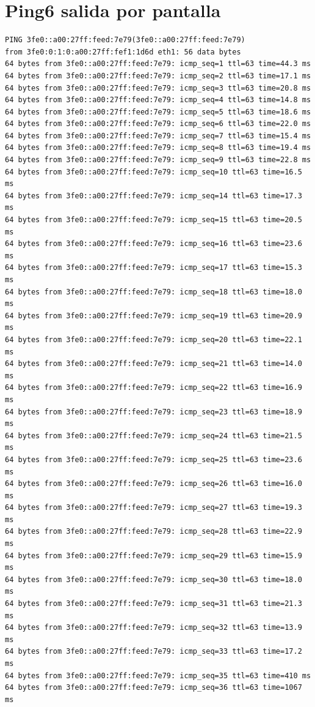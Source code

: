 \documentclass{article}
\begin{document}
\section{Ping6 salida por pantalla}
\begin{Verbatim}
PING 3fe0::a00:27ff:feed:7e79(3fe0::a00:27ff:feed:7e79)
from 3fe0:0:1:0:a00:27ff:fef1:1d6d eth1: 56 data bytes
64 bytes from 3fe0::a00:27ff:feed:7e79: icmp_seq=1 ttl=63 time=44.3 ms
64 bytes from 3fe0::a00:27ff:feed:7e79: icmp_seq=2 ttl=63 time=17.1 ms
64 bytes from 3fe0::a00:27ff:feed:7e79: icmp_seq=3 ttl=63 time=20.8 ms
64 bytes from 3fe0::a00:27ff:feed:7e79: icmp_seq=4 ttl=63 time=14.8 ms
64 bytes from 3fe0::a00:27ff:feed:7e79: icmp_seq=5 ttl=63 time=18.6 ms
64 bytes from 3fe0::a00:27ff:feed:7e79: icmp_seq=6 ttl=63 time=22.0 ms
64 bytes from 3fe0::a00:27ff:feed:7e79: icmp_seq=7 ttl=63 time=15.4 ms
64 bytes from 3fe0::a00:27ff:feed:7e79: icmp_seq=8 ttl=63 time=19.4 ms
64 bytes from 3fe0::a00:27ff:feed:7e79: icmp_seq=9 ttl=63 time=22.8 ms
64 bytes from 3fe0::a00:27ff:feed:7e79: icmp_seq=10 ttl=63 time=16.5 ms
64 bytes from 3fe0::a00:27ff:feed:7e79: icmp_seq=14 ttl=63 time=17.3 ms
64 bytes from 3fe0::a00:27ff:feed:7e79: icmp_seq=15 ttl=63 time=20.5 ms
64 bytes from 3fe0::a00:27ff:feed:7e79: icmp_seq=16 ttl=63 time=23.6 ms
64 bytes from 3fe0::a00:27ff:feed:7e79: icmp_seq=17 ttl=63 time=15.3 ms
64 bytes from 3fe0::a00:27ff:feed:7e79: icmp_seq=18 ttl=63 time=18.0 ms
64 bytes from 3fe0::a00:27ff:feed:7e79: icmp_seq=19 ttl=63 time=20.9 ms
64 bytes from 3fe0::a00:27ff:feed:7e79: icmp_seq=20 ttl=63 time=22.1 ms
64 bytes from 3fe0::a00:27ff:feed:7e79: icmp_seq=21 ttl=63 time=14.0 ms
64 bytes from 3fe0::a00:27ff:feed:7e79: icmp_seq=22 ttl=63 time=16.9 ms
64 bytes from 3fe0::a00:27ff:feed:7e79: icmp_seq=23 ttl=63 time=18.9 ms
64 bytes from 3fe0::a00:27ff:feed:7e79: icmp_seq=24 ttl=63 time=21.5 ms
64 bytes from 3fe0::a00:27ff:feed:7e79: icmp_seq=25 ttl=63 time=23.6 ms
64 bytes from 3fe0::a00:27ff:feed:7e79: icmp_seq=26 ttl=63 time=16.0 ms
64 bytes from 3fe0::a00:27ff:feed:7e79: icmp_seq=27 ttl=63 time=19.3 ms
64 bytes from 3fe0::a00:27ff:feed:7e79: icmp_seq=28 ttl=63 time=22.9 ms
64 bytes from 3fe0::a00:27ff:feed:7e79: icmp_seq=29 ttl=63 time=15.9 ms
64 bytes from 3fe0::a00:27ff:feed:7e79: icmp_seq=30 ttl=63 time=18.0 ms
64 bytes from 3fe0::a00:27ff:feed:7e79: icmp_seq=31 ttl=63 time=21.3 ms
64 bytes from 3fe0::a00:27ff:feed:7e79: icmp_seq=32 ttl=63 time=13.9 ms
64 bytes from 3fe0::a00:27ff:feed:7e79: icmp_seq=33 ttl=63 time=17.2 ms
64 bytes from 3fe0::a00:27ff:feed:7e79: icmp_seq=35 ttl=63 time=410 ms
64 bytes from 3fe0::a00:27ff:feed:7e79: icmp_seq=36 ttl=63 time=1067 ms

\end{Verbatim}
\end{document}
